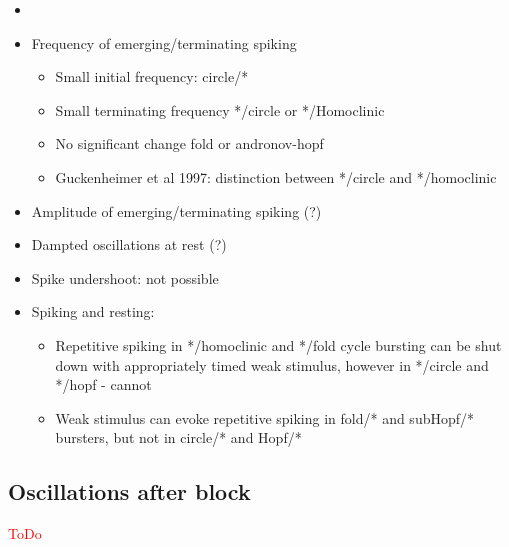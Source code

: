 \documentclass[../main.tex]{subfiles}
\begin{document}



\begin{itemize}
    \item \cite{izhikevichNEURALEXCITABILITYSPIKING2000}
    \item Frequency of emerging/terminating spiking
    \begin{itemize}
        \item Small initial frequency: circle/*
        \item Small terminating frequency */circle or */Homoclinic
        \item No significant change fold or andronov-hopf
        \item Guckenheimer et al 1997: distinction between */circle and */homoclinic
    \end{itemize}
    \item Amplitude of emerging/terminating spiking (?)
    \item Dampted oscillations at rest (?)
    \item Spike undershoot: not possible
    \item Spiking and resting:
    \begin{itemize}
        \item Repetitive spiking in */homoclinic and */fold cycle bursting can be
        shut down with appropriately timed weak stimulus, however in */circle and */hopf - cannot
        \item Weak stimulus can evoke repetitive spiking in fold/* and subHopf/* bursters, but
        not in circle/* and Hopf/*
    \end{itemize}
\end{itemize}
\color{black}

\subsection{Oscillations after  block}

\textcolor{red}{ToDo}
\end{document}
